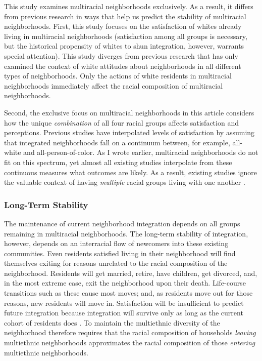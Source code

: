 \documentclass{baderart}
\begin{document}
This study examines multiracial neighborhoods exclusively. As a result, it differs from previous research in ways that help us predict the stability of multiracial neighborhoods. First, this study focuses on the satisfaction of whites already living in multiracial neighborhoods (satisfaction among all groups is necessary, but the historical propensity of whites to shun integration, however, warrants special attention). This study diverges from previous research that has only examined the context of white attitudes about neighborhoods in all different types of neighborhoods. Only the actions of white residents in multiracial neighborhoods immediately affect the racial composition of multiracial neighborhoods. 

Second, the exclusive focus on multiracial neighborhoods in this article considers how the unique \emph{combination} of all four racial groups affects satisfaction and perceptions. Previous studies have interpolated levels of satisfaction by assuming that integrated neighborhoods fall on a continuum between, for example, all-white and all-person-of-color. As I wrote earlier, multiracial neighborhoods do not fit on this spectrum, yet almost all existing studies interpolate from these continuous measures what outcomes are likely. As a result, existing studies ignore the valuable context of having \emph{multiple} racial groups living with one another \citep[for exception, see ][]{krysan_diversity_2017}.

\subsubsection{Long-Term Stability}\label{long-term-stability}

The maintenance of current neighborhood integration depends on all groups remaining in multiracial neighborhoods. The long-term stability of integration, however, depends on an interracial flow of newcomers into these existing communities. Even residents satisfied living in their neighborhood will find themselves exiting for reasons unrelated to the racial composition of the neighborhood. Residents will get married, retire, have children, get divorced, and, in the most extreme case, exit the neighborhood upon their death. Life-course transitions such as these cause most moves; and, as residents move out for those reasons, new residents will move in. Satisfaction will be insufficient to predict future integration because integration will survive only as long as the current cohort of residents does \citep[see, e.g., ][]{molotch_racial_1969}. To maintain the multiethnic diversity of the neighborhood therefore requires that the racial composition of households \emph{leaving} multiethnic neighborhoods approximates the racial composition of those \emph{entering} multiethnic neighborhoods.
\end{document}
